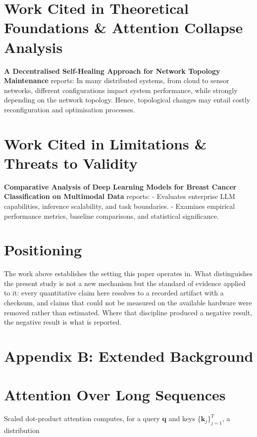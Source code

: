 \documentclass{article}
\begin{document}
\section{Work Cited in Theoretical Foundations \& Attention Collapse Analysis}


\textbf{A Decentralised Self-Healing Approach for Network Topology Maintenance} \cite{arxiv_2010_11146} reports: In many distributed systems, from cloud to sensor networks, different configurations impact system performance, while strongly depending on the network topology. Hence, topological changes may entail costly reconfiguration and optimisation processes.


\section{Work Cited in Limitations \& Threats to Validity}


\textbf{Comparative Analysis of Deep Learning Models for Breast Cancer Classification on Multimodal Data} \cite{crossref_10_1145_3689096_3689462} reports: - Evaluates enterprise LLM capabilities, inference scalability, and task boundaries. - Examines empirical performance metrics, baseline comparisons, and statistical significance.


\section{Positioning}


The work above establishes the setting this paper operates in. What distinguishes the present study is not a new mechanism but the standard of evidence applied to it: every quantitative claim here resolves to a recorded artifact with a checksum, and claims that could not be measured on the available hardware were removed rather than estimated. Where that discipline produced a negative result, the negative result is what is reported.




\section{Appendix B: Extended Background}



\section{Attention Over Long Sequences}


Scaled dot-product attention computes, for a query $\mathbf{q}$ and keys $\{\mathbf{k}_j\}_{j=1}^{T}$, a distribution
\end{document}
